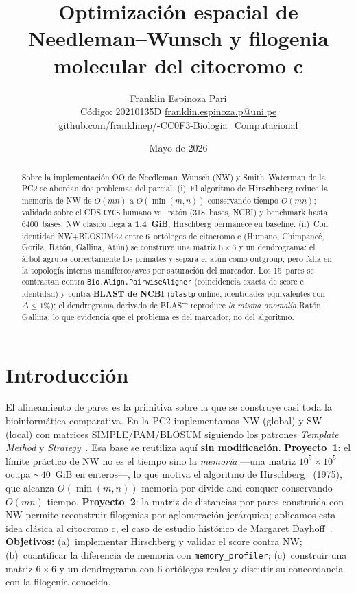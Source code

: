 \documentclass[11pt,a4paper]{article}
\title{\vspace{-1.2cm}\textbf{Optimizaci\'on espacial de Needleman--Wunsch y filogenia molecular del citocromo c}}
\author{Franklin Espinoza Pari \\ \small C\'odigo: 20210135D \quad
        \href{mailto:franklin.espinoza.p@uni.pe}{franklin.espinoza.p@uni.pe} \\
        \small \href{https://github.com/franklinep/-CC0F3-Biologia_Computacional}{github.com/franklinep/-CC0F3-Biologia\_Computacional}}
\date{Mayo de 2026}
\begin{document}
\maketitle
\vspace{-0.8cm}

\begin{abstract}\noindent\small
Sobre la implementaci\'on OO de Needleman--Wunsch (NW) y Smith--Waterman de la PC2 se abordan dos problemas del parcial. (i)~El algoritmo de \textbf{Hirschberg} reduce la memoria de NW de $O(mn)$ a $O(\min(m,n))$ conservando tiempo $O(mn)$; validado sobre el CDS \texttt{CYCS} humano vs.\ rat\'on (318~bases, NCBI) y benchmark hasta 6400~bases: NW cl\'asico llega a \textbf{1.4~GiB}, Hirschberg permanece en baseline. (ii)~Con identidad NW+BLOSUM62 entre 6~ort\'ologos de citocromo c (Humano, Chimpanc\'e, Gorila, Rat\'on, Gallina, At\'un) se construye una matriz $6{\times}6$ y un dendrograma: el \'arbol agrupa correctamente los primates y separa el at\'un como outgroup, pero falla en la topolog\'ia interna mam\'iferos/aves por saturaci\'on del marcador. Los 15~pares se contrastan contra \texttt{Bio.Align.PairwiseAligner} (coincidencia exacta de score e identidad) y contra \textbf{BLAST de NCBI} (\texttt{blastp} online, identidades equivalentes con $\Delta \le 1\%$); el dendrograma derivado de BLAST reproduce \emph{la misma anomal\'ia} Rat\'on--Gallina, lo que evidencia que el problema es del marcador, no del algoritmo.
\end{abstract}

\vspace{-0.8em}

\section{Introducci\'on}
El alineamiento de pares es la primitiva sobre la que se construye casi toda la bioinform\'atica comparativa. En la PC2 implementamos NW (global) y SW (local) con matrices SIMPLE/PAM/BLOSUM siguiendo los patrones \emph{Template Method} y \emph{Strategy}~\cite{informeprev}. Esa base se reutiliza aqu\'i \textbf{sin modificaci\'on}. \textbf{Proyecto~1}: el l\'imite pr\'actico de NW no es el tiempo sino la \emph{memoria} ---una matriz $10^5{\times}10^5$ ocupa $\sim 40$~GiB en enteros---, lo que motiva el algoritmo de Hirschberg~\cite{hirschberg1975} (1975), que alcanza $O(\min(m,n))$ memoria por divide-and-conquer conservando $O(mn)$ tiempo. \textbf{Proyecto~2}: la matriz de distancias por pares construida con NW permite reconstruir filogenias por aglomeraci\'on jer\'arquica; aplicamos esta idea cl\'asica al citocromo c, el caso de estudio hist\'orico de Margaret Dayhoff~\cite{dayhoff1978}. \textbf{Objetivos:} (a)~implementar Hirschberg y validar el score contra NW; (b)~cuantificar la diferencia de memoria con \texttt{memory\_profiler}; (c)~construir una matriz $6{\times}6$ y un dendrograma con 6 ort\'ologos reales y discutir su concordancia con la filogenia conocida.
\end{document}
